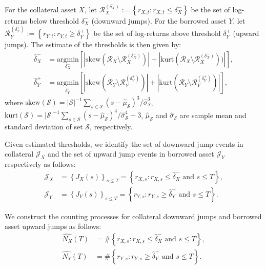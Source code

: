 \documentclass{article}
\theoremstyle{definition}
\begin{document}
For the collateral asset $X$, let $\mathcal{R}_X^{(\delta_X^-)}:=\left\{r_{X,t}: r_{X,t} \leq \delta_X^-\right\}$ be the set of log-returns below threshold $\delta_X^-$ (downward jumps). For the borrowed asset $Y$, let $\mathcal{R}_Y^{(\delta_Y^+)}:=\left\{r_{Y,t}: r_{Y,t} \geq \delta_Y^+\right\}$ be the set of log-returns above threshold $\delta_Y^+$ (upward jumps).
The estimate of the thresholds is then given by:
\begin{align}
 \widehat\delta_X^- &= \underset{\delta_X^-}{\text{argmin}}  \left[
   |\text{skew}(\mathcal{R}_X \setminus \mathcal{R}_X^{(\delta_X^-)})|+|\text{kurt}(\mathcal{R}_X \setminus \mathcal{R}_X^{(\delta_X^-)}))|
   \right], \\
 \widehat\delta_Y^+ &= \underset{\delta_Y^+}{\text{argmin}}  \left[
   |\text{skew}(\mathcal{R}_Y \setminus \mathcal{R}_Y^{(\delta_Y^+)})|+|\text{kurt}(\mathcal{R}_Y \setminus \mathcal{R}_Y^{(\delta_Y^+)})|
   \right],
\end{align}
where $\text{skew}(\mathcal{S}) = |\mathcal{S}|^{-1}\sum_{s \in \mathcal{S}}(s-\hat \mu_\mathcal{S})^3/\hat \sigma_\mathcal{S}^3$, 
      $\text{kurt}(\mathcal{S}) = |\mathcal{S}|^{-1}\sum_{s \in \mathcal{S}}(s-\hat \mu_\mathcal{S})^4/\hat \sigma_\mathcal{S}^4 - 3$, 
     $\hat \mu_\mathcal{S}$ and $\hat \sigma_\mathcal{S}$ are sample mean and standard deviation of set $\mathcal{S}$, respectively.

Given estimated thresholds, we identify the set of downward jump events in collateral $\mathcal{J}_X$ and the set of upward jump events in borrowed asset $\mathcal{J}_Y$ respectively as follows:
\begin{equation}
   \begin{split}
   \mathcal{J}_X &= \left\{J_X(s)\right\}_{s \leq T} = \left\{
     r_{X,s}: r_{X,s} \leq \widehat\delta_X^- \text{ and } s \leq T
     \right\},\\
     \mathcal{J}_Y &= \left\{J_Y(s)\right\}_{s \leq T} = \left\{
       r_{Y,s}: r_{Y,s} \geq \widehat\delta_Y^+ \text{ and } s \leq T
       \right\}.
   \end{split}
\end{equation}

We construct the counting processes for collateral downward jumps and borrowed asset upward jumps as follows:
\begin{equation}
   \begin{split}
   \widehat{N_X}(T) &= \#\left\{
       r_{X,s}: r_{X,s} \leq \widehat\delta_X^- \text{ and } s \leq T
       \right\}, \\ 
   \widehat{N_Y}(T) &= \#\left\{
       r_{Y,s}: r_{Y,s} \geq \widehat\delta_Y^+ \text{ and } s \leq T
       \right\}.
   \end{split}
\end{equation}
\end{document}
